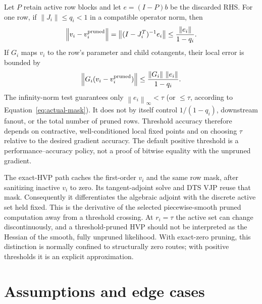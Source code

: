 \documentclass[11pt]{article}
\newcommand{\norm}[1]{\left\lVert #1\right\rVert}
\begin{document}
Let $P$ retain active row blocks and let $e=(I-P)b$ be the discarded RHS.  For
one row, if $\norm{J_i}\le q_i<1$ in a compatible operator norm, then
\begin{equation}
  \norm{v_i-v_i^{\rm pruned}}
  =\norm{(I-J_i^T)^{-1}e_i}
  \le \frac{\norm{e_i}}{1-q_i}.
  \label{eq:adjoint-error}
\end{equation}
If $G_i$ maps $v_i$ to the row's parameter and child cotangents, their local
error is bounded by
\begin{equation}
  \norm{G_i(v_i-v_i^{\rm pruned})}
  \le \frac{\norm{G_i}\,\norm{e_i}}{1-q_i}.
  \label{eq:gradient-error}
\end{equation}
The infinity-norm test guarantees only $\norm{e_i}_\infty<\tau$ (or
$\le\tau$, according to Equation~\eqref{eq:actual-mask}).  It does not by
itself control $1/(1-q_i)$, downstream fanout, or the total number of pruned
rows.  Threshold accuracy therefore depends on contractive, well-conditioned
local fixed points and on choosing $\tau$ relative to the desired gradient
accuracy.  The default positive threshold is a performance--accuracy policy,
not a proof of bitwise equality with the unpruned gradient.

The exact-HVP path caches the first-order $v_i$ and the same row mask, after
sanitizing inactive $v_i$ to zero.  Its tangent-adjoint solve and DTS VJP reuse
that mask.  Consequently it differentiates the algebraic adjoint with the
discrete active set held fixed.  This is the derivative of the selected
piecewise-smooth pruned computation away from a threshold crossing.  At
$r_i=\tau$ the active set can change discontinuously, and a threshold-pruned
HVP should not be interpreted as the Hessian of the smooth, fully unpruned
likelihood.  With exact-zero pruning, this distinction is normally confined
to structurally zero routes; with positive thresholds it is an explicit
approximation.

\section{Assumptions and edge cases}
\end{document}
